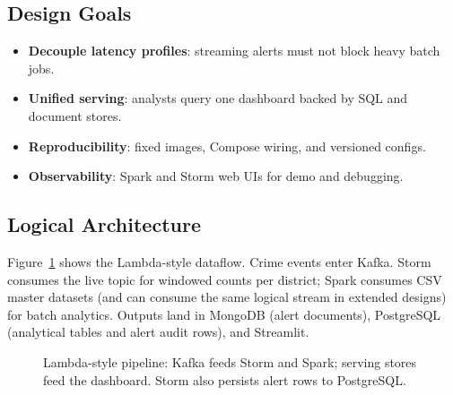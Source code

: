 \documentclass[12pt,a4paper]{article}
\begin{document}
\subsection{Design Goals}
\begin{itemize}
    \item \textbf{Decouple latency profiles}: streaming alerts must not block heavy batch jobs.
    \item \textbf{Unified serving}: analysts query one dashboard backed by SQL and document stores.
    \item \textbf{Reproducibility}: fixed images, Compose wiring, and versioned configs.
    \item \textbf{Observability}: Spark and Storm web UIs for demo and debugging.
\end{itemize}

\subsection{Logical Architecture}
Figure~\ref{fig:lambda} shows the Lambda-style dataflow. Crime events enter Kafka. Storm consumes the live topic for windowed counts per district; Spark consumes CSV master datasets (and can consume the same logical stream in extended designs) for batch analytics. Outputs land in MongoDB (alert documents), PostgreSQL (analytical tables and alert audit rows), and Streamlit.

\begin{figure}[ht]
\centering
{}
\caption{Lambda-style pipeline: Kafka feeds Storm and Spark; serving stores feed the dashboard. Storm also persists alert rows to PostgreSQL.}
\label{fig:lambda}
\end{figure}
\end{document}

